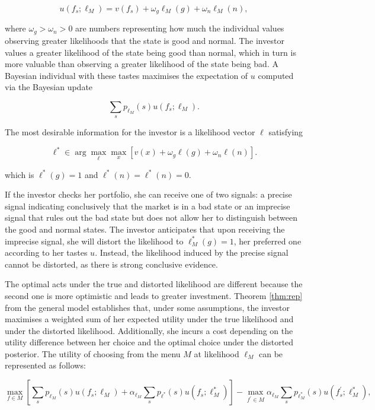 \[
	u \left( f_s; \ell_{M} \right) = v \left( f_s \right) + \omega_{g} \ell_{M} \left( g \right) + \omega_{n} \ell_{M} \left( n \right) ,
\]

where \( \omega_{g} > \omega_{n} > 0 \) are numbers representing how much the individual values observing greater likelihoods that the state is good and normal. The investor values a greater likelihood of the state being good than normal, which in turn is more valuable than observing a greater likelihood of the state being bad. A Bayesian individual with these tastes maximises the expectation of \( u \) computed via the Bayesian update

\[
	\sum_{s} p_{\ell_M} \left( s \right) u \left( f_s; \ell_M \right) .
\]

The most desirable information for the investor is a likelihood vector \( \ell \) satisfying

\[
	\ell^{*} \in \arg \max_{\ell} \max_{x} \left[ v \left( x \right) + \omega_{g} \ell \left( g \right) + \omega_{n} \ell \left( n \right) \right] .
\]

which is \( \ell^{*} \left( g \right) = 1 \) and \(\ell^{*} \left( n \right) = \ell^{*} \left( n \right) = 0 \).

If the investor checks her portfolio, she can receive one of two signals: a precise signal indicating conclusively that the market is in a bad state or an imprecise signal that rules out the bad state but does not allow her to distinguish between the good and normal states. The investor anticipates that upon receiving the imprecise signal, she will distort the likelihood to \( \ell_M^{*} \left( g \right) = 1 \), her preferred one according to her tastes \( u \). Instead, the likelihood induced by the precise signal cannot be distorted, as there is strong conclusive evidence.

The optimal acts under the true and distorted likelihood are different because the second one is more optimistic and leads to greater investment. Theorem \ref{thm:rep} from the general model establishes that, under some assumptions, the investor maximises a weighted sum of her expected utility under the true likelihood and under the distorted likelihood. Additionally, she incurs a cost depending on the utility difference between her choice and the optimal choice under the distorted posterior. The utility of choosing from the menu \( M \) at likelihood \( \ell_M \) can be represented as follows:

\begin{equation}\label{eq:example}
	\max _{f \in M} \left[ \sum_{s} p_{\ell_M} \left( s \right) u \left( f_s; \ell_M \right) + \alpha_{\ell_{M}} \sum_{s} p_{\ell^{*}} \left( s \right) u \left( f_s;  \ell^{*}_M \right) \right] - \max _{f^{\prime} \in M} \alpha _{\ell_{M}} \sum_{s} p_{\ell^{*}_{M}} \left( s \right) u\left(f^{\prime}_{s} ; \ell^{*}_{M} \right) ,
\end{equation}

